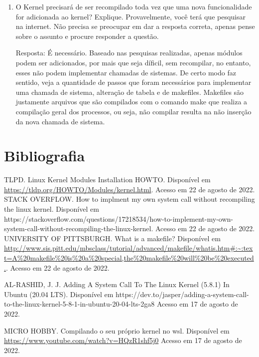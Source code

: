 \documentclass[a4paper, 12pt]{article}
\begin{document}
\begin{enumerate}
		\item O Kernel precisará de ser recompilado toda vez que uma nova funcionalidade for adicionada ao kernel? Explique. Provavelmente, você terá que pesquisar na internet. Não precisa se preocupar em dar a resposta correta, apenas pense sobre o assunto e procure responder a questão.
		
		Resposta: É necessário. Baseado nas pesquisas realizadas, apenas módulos podem ser adicionados, por mais que seja díficil, sem recompilar, no entanto, esses não podem implementar chamadas de sistemas. De certo modo faz sentido, veja a quantidade de passos que foram necessários para implementar uma chamada de sistema, alteração de tabela e de makefiles. Makefiles são justamente arquivos que são compilados com o comando make que realiza a compilação geral dos processos, ou seja, não compilar resulta na não inserção da nova chamada de sistema.
		
		
	\end{enumerate}
\newpage

\section*{Bibliografia}
\footnotesize{

\noindent TLPD. Linux Kernel Modules Installation HOWTO. Disponível em \url{https://tldp.org/HOWTO/Modules/kernel.html}. Acesso em 22 de agosto de 2022.\\

\noindent STACK OVERFLOW. How to implment my own system call without recompiling the linux kernel. Disponível em https://stackoverflow.com/questions/17218534/how-to-implement-my-own-system-call-without-recompiling-the-linux-kernel. Acesso em 22 de agosto de 2022.\\

\noindent UNIVERSITY OF PITTSBURGH. What is a makefile? Disponível em \url{http://www.sis.pitt.edu/mbsclass/tutorial/advanced/makefile/whatis.htm#:~:text=A%20makefile%20is%20a%20special,the%20makefile%20will%20be%20executed.}. Acesso em 22 de agosto de 2022.

\noindent AL-RASHID, J. J. Adding A System Call To The Linux Kernel (5.8.1) In Ubuntu (20.04 LTS). Disponível em https://dev.to/jasper/adding-a-system-call-to-the-linux-kernel-5-8-1-in-ubuntu-20-04-lts-2ga8 Acesso em 17 de agosto de 2022.

\noindent MICRO HOBBY. Compilando o seu próprio kernel no wsl. Disponível em \url{https://www.youtube.com/watch?v=HQzR1shf5j0} Acesso em 17 de agosto de 2022.

}
\newpage
\end{document}

